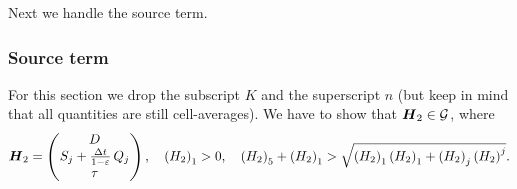 \documentclass[10pt,preprint]{aastex}
\begin{document}
Next we handle the source term.

\subsubsection{Source term}
For this section we drop the subscript $K$ and the superscript $n$ (but keep in mind that all quantities are still cell-averages). We have to show that $\boldsymbol{H}_{2}\in\mathcal{G}$, where
\begin{equation}
    \boldsymbol{H}_{2}=\begin{pmatrix}D\\ S_{j}+\frac{\Delta t}{1-\varepsilon}\,Q_{j} \\ \tau\end{pmatrix},\hspace{1em}\left(H_{2}\right)_{1}>0,\hspace{1em}\left(H_{2}\right)_{5}+\left(H_{2}\right)_{1}>\sqrt{\left(H_{2}\right)_{1}\left(H_{2}\right)_{1}+\left(H_{2}\right)_{j}\left(H_{2}\right)^{j}}.
\end{equation}
\end{document}
